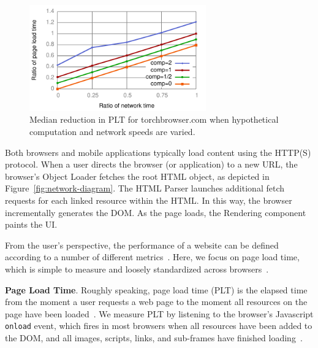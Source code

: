\begin{figure}[t]
    \includegraphics[width=3in]{../graphs/whatif/ilivid.pdf}
    \caption[]{\label{fig:whatif}Median reduction in PLT
    for torchbrowser.com when hypothetical computation and network speeds are varied.}
\end{figure}
Both browsers and mobile applications typically load content using the HTTP(S) protocol. When a user directs the browser (or application) to a new URL, the browser's Object Loader fetches the root HTML object, as depicted
in Figure~\ref{fig:network-diagram}. The HTML Parser launches additional
fetch requests for each linked resource within the HTML. In this way, the browser incrementally generates the DOM.
As the page loads, the Rendering component paints the UI.

From the user's perspective, the performance of a website can be defined according to a number of different metrics~\cite{above-the-fold,speed-index}. Here,
we focus on page load time, which is simple to measure
and loosely standardized across browsers~\cite{w3c-onload}.

\textbf{Page Load Time}. Roughly speaking, page load time (PLT) is the elapsed time from the moment a user requests a web page to the moment all resources on the page have been loaded~\cite{page-speed}.
We measure PLT by listening to the browser's Javascript \texttt{onload} event,
which fires in most browsers when all resources have been added to the DOM, and all images,
scripts, links, and sub-frames have finished loading~\cite{w3c-onload}.


